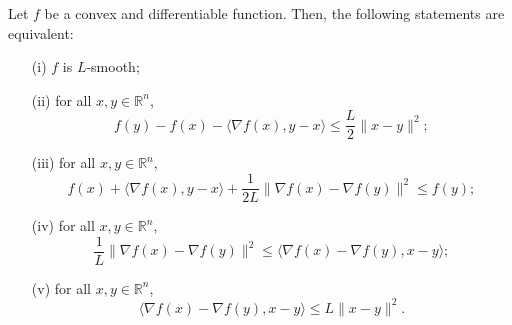 \begin{lemma}
  \label{lem:smooth_characterizations}
  \leanok
  Let $f$ be a convex and differentiable function. Then, the following statements are equivalent:
  \begin{enumerate}
    \item[(i)] $f$ is $L$-smooth;
    \item[(ii)] for all $x, y \in \mathbb{R}^n$,
    \[
      f(y) - f(x) - \langle\nabla f(x), y - x\rangle \leq \frac{L}{2}\|x - y\|^2;
    \]
    \item[(iii)] for all $x, y \in \mathbb{R}^n$,
    \[
      f(x) + \langle\nabla f(x), y - x\rangle + \frac{1}{2L}\|\nabla f(x) - \nabla f(y)\|^2 \leq f(y);
    \]
    \item[(iv)] for all $x, y \in \mathbb{R}^n$,
    \[
      \frac{1}{L}\|\nabla f(x) - \nabla f(y)\|^2 \leq \langle\nabla f(x) - \nabla f(y), x - y\rangle;
    \]
    \item[(v)] for all $x, y \in \mathbb{R}^n$,
    \[
      \langle\nabla f(x) - \nabla f(y), x - y\rangle \leq L\|x - y\|^2.
    \]
  \end{enumerate}
\end{lemma}

